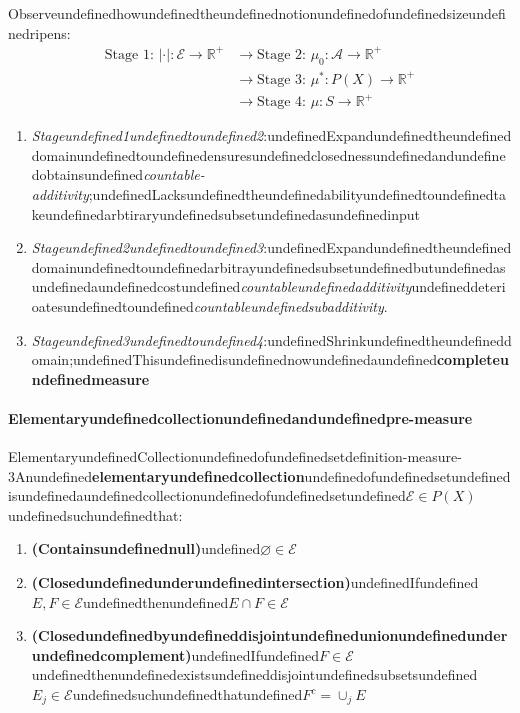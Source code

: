 Observeundefinedhowundefinedtheundefinednotionundefinedofundefinedsizeundefinedripens:
\begin{equation}
\begin{aligned}
\text{Stage 1: $\boxed{|\cdot|:\mathcal E \to \mathbb{R}^+}$} 
&\longrightarrow \text{Stage 2: $\boxed{\mu_0: \mathcal A \to  \mathbb{R}^+}$} \\ 
&\longrightarrow \text{Stage 3: $\boxed{\mu^* : P(X)\to \mathbb{R}^+}$} \\ 
&\longrightarrow \text{Stage 4: $\boxed{\mu: S \to \mathbb{R}^{+}}$}
\end{aligned}
\end{equation}

\begin{enumerate}
\item \textit{Stageundefined1undefinedtoundefined2}:undefinedExpandundefinedtheundefineddomainundefinedtoundefinedensuresundefinedclosednessundefinedandundefinedobtainsundefined\textit{countable-additivity};undefinedLacksundefinedtheundefinedabilityundefinedtoundefinedtakeundefinedarbtiraryundefinedsubsetundefinedasundefinedinput
\item \textit{Stageundefined2undefinedtoundefined3}:undefinedExpandundefinedtheundefineddomainundefinedtoundefinedarbitrayundefinedsubsetundefinedbutundefinedasundefinedaundefinedcostundefined\textit{countableundefinedadditivity}undefineddeterioatesundefinedtoundefined\textit{countableundefinedsubadditivity}.
\item \textit{Stageundefined3undefinedtoundefined4}:undefinedShrinkundefinedtheundefineddomain;undefinedThisundefinedisundefinednowundefinedaundefined\textbf{completeundefinedmeasure}
\end{enumerate}

\paragraph{Elementaryundefinedcollectionundefinedandundefinedpre-measure}

\begin{mystthmdefinition}{ElementaryundefinedCollectionundefinedofundefinedset}{definition-measure-3}Anundefined\textbf{elementaryundefinedcollection}undefinedofundefinedsetundefinedisundefinedaundefinedcollectionundefinedofundefinedsetundefined$\mathcal E \in P(X)$undefinedsuchundefinedthat:

\begin{enumerate}
\item \textbf{(Containsundefinednull)}undefined$\varnothing \in \mathcal E$
\item \textbf{(Closedundefinedunderundefinedintersection)}undefinedIfundefined$E,F\in \mathcal E$undefinedthenundefined$E\cap F\in \mathcal E$
\item \textbf{(Closedundefinedbyundefineddisjointundefinedunionundefinedunderundefinedcomplement)}undefinedIfundefined$F\in \mathcal E$undefinedthenundefinedexistsundefineddisjointundefinedsubsetsundefined$E_j\in \mathcal E$undefinedsuchundefinedthatundefined$F^c = \cup_j E$
\end{enumerate}

\end{mystthmdefinition}
